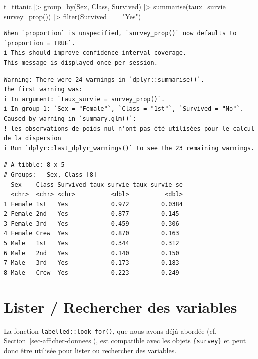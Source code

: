 \documentclass[
  letterpaper,
  DIV=11,
  numbers=noendperiod,
  oneside]{scrreprt}
\newenvironment{Shaded}{\begin{snugshade}}{\end{snugshade}}
\newcommand{\AttributeTok}[1]{\textcolor[rgb]{0.40,0.45,0.13}{#1}}
\newcommand{\FunctionTok}[1]{\textcolor[rgb]{0.28,0.35,0.67}{#1}}
\newcommand{\NormalTok}[1]{\textcolor[rgb]{0.00,0.23,0.31}{#1}}
\newcommand{\SpecialCharTok}[1]{\textcolor[rgb]{0.37,0.37,0.37}{#1}}
\newcommand{\StringTok}[1]{\textcolor[rgb]{0.13,0.47,0.30}{#1}}
\begin{document}
\begin{Shaded}
\begin{Highlighting}[]
\NormalTok{t\_titanic }\SpecialCharTok{|\textgreater{}} 
  \FunctionTok{group\_by}\NormalTok{(Sex, Class, Survived) }\SpecialCharTok{|\textgreater{}} 
  \FunctionTok{summarise}\NormalTok{(}\AttributeTok{taux\_survie =} \FunctionTok{survey\_prop}\NormalTok{()) }\SpecialCharTok{|\textgreater{}} 
  \FunctionTok{filter}\NormalTok{(Survived }\SpecialCharTok{==} \StringTok{"Yes"}\NormalTok{)}
\end{Highlighting}
\end{Shaded}

\begin{verbatim}
When `proportion` is unspecified, `survey_prop()` now defaults to `proportion = TRUE`.
i This should improve confidence interval coverage.
This message is displayed once per session.
\end{verbatim}

\begin{verbatim}
Warning: There were 24 warnings in `dplyr::summarise()`.
The first warning was:
i In argument: `taux_survie = survey_prop()`.
i In group 1: `Sex = "Female"`, `Class = "1st"`, `Survived = "No"`.
Caused by warning in `summary.glm()`:
! les observations de poids nul n'ont pas été utilisées pour le calcul de la dispersion
i Run `dplyr::last_dplyr_warnings()` to see the 23 remaining warnings.
\end{verbatim}

\begin{verbatim}
# A tibble: 8 x 5
# Groups:   Sex, Class [8]
  Sex    Class Survived taux_survie taux_survie_se
  <chr>  <chr> <chr>          <dbl>          <dbl>
1 Female 1st   Yes            0.972         0.0384
2 Female 2nd   Yes            0.877         0.145 
3 Female 3rd   Yes            0.459         0.306 
4 Female Crew  Yes            0.870         0.163 
5 Male   1st   Yes            0.344         0.312 
6 Male   2nd   Yes            0.140         0.150 
7 Male   3rd   Yes            0.173         0.183 
8 Male   Crew  Yes            0.223         0.249 
\end{verbatim}

\hypertarget{lister-rechercher-des-variables}{%
\section{Lister / Rechercher des
variables}\label{lister-rechercher-des-variables}}

La fonction \texttt{labelled::look\_for()}, que nous avons déjà abordée
(cf. Section~\ref{sec-afficher-donnees}), est compatible avec les objets
\texttt{\{survey\}} et peut donc être utilisée pour lister ou rechercher
des variables.
\end{document}
